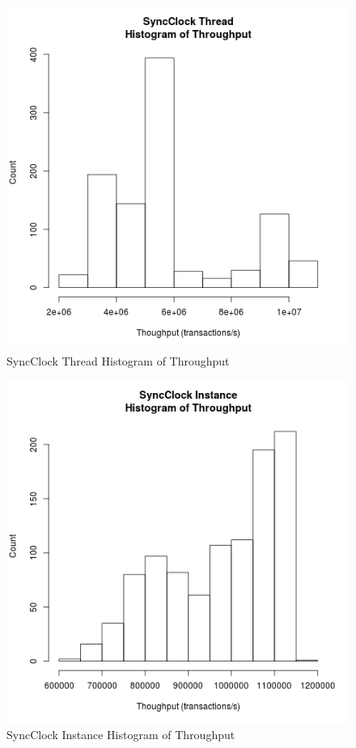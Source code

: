 \clearpage

\begin{figure}[H]
\center
\includegraphics[height=.4\textheight]{sync_thread_throughput_hist.png}
\caption{SyncClock Thread Histogram of Throughput}
\label{sync_thread_throughput}
\end{figure}

\begin{figure}[H]
\center
\includegraphics[height=.4\textheight]{sync_instance_throughput_hist.png}
\caption{SyncClock Instance Histogram of Throughput}
\label{sync_instance_throughput}
\end{figure}

